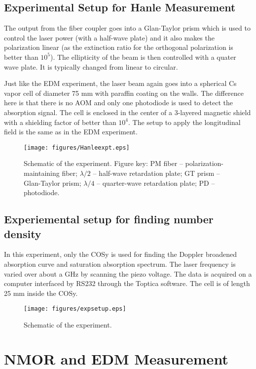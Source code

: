 \section{Experimental Setup for Hanle Measurement}

The output from the fiber coupler goes into a Glan-Taylor prism which is used to control the laser power (with a half-wave plate) and it also makes the polarization linear (as the extinction ratio for the orthogonal polarization is better than $10^5$). The ellipticity of the beam is then controlled with a quater wave plate. It is typically changed from linear to circular.

Just like the EDM experiment, the laser beam again goes into a spherical Cs vapor cell of diameter 75 mm with paraffin coating on the walls. The difference here is that there is no AOM and only one photodiode is used to detect the absorption signal. The cell is enclosed in the center of a 3-layered magnetic shield with a shielding factor of better than $10^4$. The setup to apply the longitudinal field is the same as in the EDM experiment.

\begin{figure*}[ht]
	\centering
	\texttt{[image: figures/Hanleexpt.eps]}
	\caption{Schematic of the experiment. Figure key: PM fiber -- polarization-maintaining fiber; $\lambda /2$ -- half-wave retardation plate; GT prism -- Glan-Taylor prism; $\lambda /4$ -- quarter-wave retardation plate; PD -- photodiode.}
	\label{fig:Hanleexpt}
\end{figure*}

\section{Experiemental setup for finding number density}

In this experiment, only the COSy is used for finding the Doppler broadened absorption curve and saturation absorption spectrum. The laser frequency is varied over about a GHz by scanning the piezo voltage. The data is acquired on a computer interfaced by RS232 through the Toptica software. The cell is of length 25 mm inside the COSy.
	
\begin{figure}[h!]
	\centering
	\texttt{[image: figures/expsetup.eps]}
	\caption{\label{fig:expsetup}Schematic of the experiment.}
\end{figure}

\chapter{NMOR and EDM Measurement}

